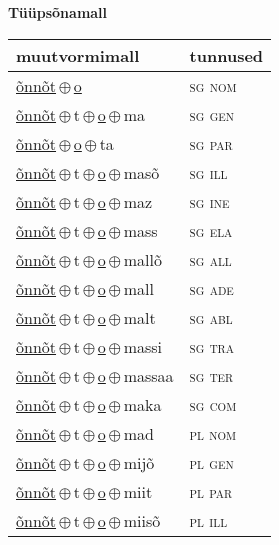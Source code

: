 

\vspace{3.5em}
\noindent \begin{minipage}{\textwidth}
\noindent \textbf{Tüüpsõnamall \,}\\

\begin{sideways}
\begin{tabular}{l l}
muutvormimall & tunnused \\
\hline
\underline{õnnõt}\,$\oplus$\,\underline{o} & \textsc{ sg nom } \\
\underline{õnnõt}\,$\oplus$\,t\,$\oplus$\,\underline{o}\,$\oplus$\,ma & \textsc{ sg gen } \\
\underline{õnnõt}\,$\oplus$\,\underline{o}\,$\oplus$\,ta & \textsc{ sg par } \\
\underline{õnnõt}\,$\oplus$\,t\,$\oplus$\,\underline{o}\,$\oplus$\,masõ & \textsc{ sg ill } \\
\underline{õnnõt}\,$\oplus$\,t\,$\oplus$\,\underline{o}\,$\oplus$\,maz & \textsc{ sg ine } \\
\underline{õnnõt}\,$\oplus$\,t\,$\oplus$\,\underline{o}\,$\oplus$\,mass & \textsc{ sg ela } \\
\underline{õnnõt}\,$\oplus$\,t\,$\oplus$\,\underline{o}\,$\oplus$\,mallõ & \textsc{ sg all } \\
\underline{õnnõt}\,$\oplus$\,t\,$\oplus$\,\underline{o}\,$\oplus$\,mall & \textsc{ sg ade } \\
\underline{õnnõt}\,$\oplus$\,t\,$\oplus$\,\underline{o}\,$\oplus$\,malt & \textsc{ sg abl } \\
\underline{õnnõt}\,$\oplus$\,t\,$\oplus$\,\underline{o}\,$\oplus$\,massi & \textsc{ sg tra } \\
\underline{õnnõt}\,$\oplus$\,t\,$\oplus$\,\underline{o}\,$\oplus$\,massaa & \textsc{ sg ter } \\
\underline{õnnõt}\,$\oplus$\,t\,$\oplus$\,\underline{o}\,$\oplus$\,maka & \textsc{ sg com } \\
\underline{õnnõt}\,$\oplus$\,t\,$\oplus$\,\underline{o}\,$\oplus$\,mad & \textsc{ pl nom } \\
\underline{õnnõt}\,$\oplus$\,t\,$\oplus$\,\underline{o}\,$\oplus$\,mijõ & \textsc{ pl gen } \\
\underline{õnnõt}\,$\oplus$\,t\,$\oplus$\,\underline{o}\,$\oplus$\,miit & \textsc{ pl par } \\
\underline{õnnõt}\,$\oplus$\,t\,$\oplus$\,\underline{o}\,$\oplus$\,miisõ & \textsc{ pl ill } \\

\end{tabular}
\end{sideways}
\end{minipage}
